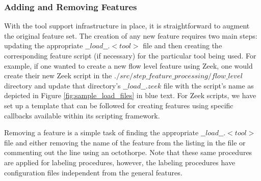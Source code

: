 \documentclass[sigconf, anonymous, screen]{acmart}
\begin{document}
\subsubsection{Adding and Removing Features}\label{subsubsec:adding_removing_features}
With the tool support infrastructure in place, it is straightforward to augment the original feature set.
The creation of any new feature requires two main steps:  updating the appropriate $\_\_load\_\_.<tool>$ file and then creating the corresponding feature script (if necessary) for the particular tool being used.
For example, if one wanted to create a new flow level feature using Zeek, one would create their new Zeek script in the $./src/step\_feature\_processing/flow\_level$ directory and update that directory's $\_\_load\_\_.zeek$ file with the script's name as depicted in Figure \ref{fig:sample_load_files} in blue text.
For Zeek scripts, we have set up a template that can be followed for creating features using specific callbacks available within its scripting framework.

Removing a feature is a simple task of finding the appropriate $\_\_load\_\_.<tool>$ file and either removing the name of the feature from the listing in the file or commenting out the line using an octothorpe.
Note that these same procedures are applied for labeling procedures, however, the labeling procedures have configuration files independent from the general features.
\end{document}

